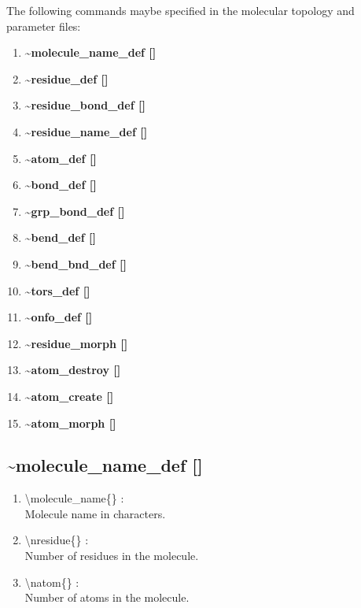 \documentclass[12pt,titlepage]{article}
\begin{document}
The following commands maybe specified in the molecular topology 
and parameter files:
\begin{enumerate}
\item {\bf \~{ }molecule\_name\_def []}
\item {\bf \~{ }residue\_def []}
\item {\bf \~{ }residue\_bond\_def []}
\item {\bf \~{ }residue\_name\_def []}
\item {\bf \~{ }atom\_def []} 
\item {\bf \~{ }bond\_def []}
\item {\bf \~{ }grp\_bond\_def []}
\item {\bf \~{ }bend\_def []}
\item {\bf \~{ }bend\_bnd\_def []}
\item {\bf \~{ }tors\_def []}
\item {\bf \~{ }onfo\_def   []}   
\item {\bf \~{ }residue\_morph []}
\item {\bf \~{ }atom\_destroy []}
\item {\bf \~{ }atom\_create []}
\item {\bf \~{ }atom\_morph []}
\end{enumerate}

\newpage
\subsection*{\bf \~{ }molecule\_name\_def []}

\begin{enumerate}

 \vspace{0.15in} 
 \item  \textbackslash molecule\_name\{\} : \\ 
    Molecule name in characters.

 \vspace{0.15in} 
 \item  \textbackslash nresidue\{\} : \\ 
    Number of residues in the molecule.

 \vspace{0.15in} 
 \item  \textbackslash natom\{\} : \\ 
    Number of atoms in the molecule.
\end{enumerate}
\end{document}
